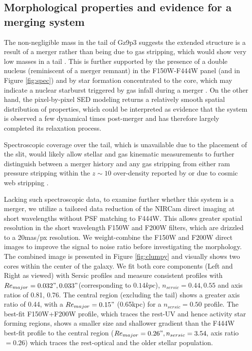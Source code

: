 \documentclass[sn-mathphys]{sn-jnl}%
\theoremstyle{thmstyleone}%
\theoremstyle{thmstyletwo}%
\theoremstyle{thmstylethree}%
\begin{document}
\subsection{Morphological properties and evidence for a merging system}\label{sec:merging}

The non-negligible mass in the tail of Gz9p3 suggests the extended structure is a result of a merger rather than being due to gas stripping, which would show very low masses in a tail \citep{Vulcani21}. This is further supported by the presence of a double nucleus (reminiscent of a merger remnant) in the F150W-F444W panel (and in Figure \ref{fig:spec}) and by star formation concentrated to the core, which may indicate a nuclear starburst triggered by gas infall during a merger \citep{Springel00, Barnes02, Naab06}. On the other hand, the pixel-by-pixel SED modeling returns a relatively smooth spatial distribution of properties, which could be interpreted as evidence that the system is observed a few dynamical times post-merger and has therefore largely completed its relaxation process. 

Spectroscopic coverage over the tail, which is unavailable due to the placement of the slit, would likely allow stellar and gas kinematic measurements to further distinguish between a merger history and any gas stripping from either ram pressure stripping within the $z\sim10$ over-density reported by \cite{Castellano22b} or due to cosmic web stripping \cite{Benitez-Llambay13}.

Lacking such spectroscopic data, to examine further whether this system is a merger, we utilize a tailored data reduction of the NIRCam direct imaging at short wavelengths without PSF matching to F444W. This allows greater spatial resolution in the short wavelength F150W and F200W filters, which are drizzled to a 20mas/px resolution. We weight-combine the F150W and F200W direct images to improve the signal to noise ratio before investigating the morphology. {The combined image is presented in Figure \ref{fig:clumpy} and visually shows two cores within the center of the galaxy. We fit both core components (Left and Right as viewed) with Sersic profiles and measure consistent profiles with $Re_{major}= 0.032",  0.033"$(corresponding to $0.14kpc$), $n_{sersic}=0.44, 0.55$ and axis ratios of 0.81, 0.76. The central region (excluding the tail) shows a greater axis ratio of 0.44, with a  $Re_{major}=0.15"$ (0.65kpc) for a $n_{sersic}=0.50$ profile. The best-fit F150W+F200W profile, which traces the rest-UV and hence activity star forming regions, shows a smaller size and shallower gradient than the F444W best-fit profile to the central region ($Re_{major}=0.26", n_{sersic}=3.54,$ axis ratio$=0.26$) which traces the rest-optical and the older stellar population.}
\end{document}
